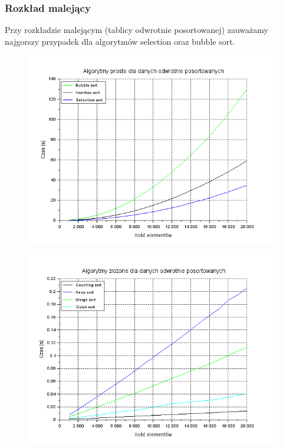 \documentclass{article}
\begin{document}
\subsubsection{Rozkład malejący}
Przy rozkładzie malejącym (tablicy odwrotnie posortowanej) zauważamy najgorszy przypadek dla algorytmów selection oraz bubble sort.

\begin{figure}[h]
\centering
\begin{minipage}{.5\textwidth}
  \centering
  \includegraphics[width=1\linewidth]{proste odwrotnie posortowane.png}
  \label{fig:proste_reverse_sorted}
\end{minipage}%
\begin{minipage}{.5\textwidth}
  \centering
  \includegraphics[width=1\linewidth]{zlozone odwrotnie posortowane.png}
  \label{fig:zlozone_odwrotnie_posoortwane}
\end{minipage}
\end{figure}
\end{document}
